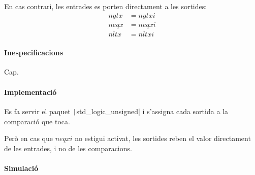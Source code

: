 En cas contrari, les entrades es porten directament a les sortides:
%
\begin{align*}
  ngtx &= ngtxi \\
  neqx &= neqxi \\
  nltx &= nltxi
\end{align*}

\paragraph{Inespecificacions}

Cap.

\paragraph{Implementació}




Es fa servir el paquet \texttt|std_logic_unsigned| i s'assigna cada sortida a la comparació que toca.

Però en cas que $neqxi$ no estigui activat, les sortides reben el valor directament de les entrades, i no de les comparacions.

\paragraph{Simulació}

